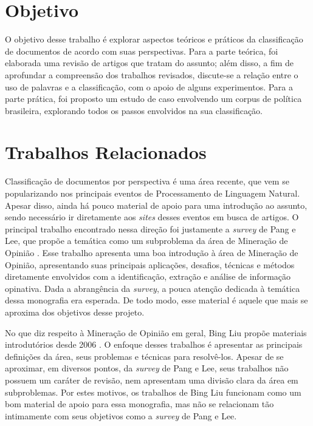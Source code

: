 
\section{Objetivo}
\label{objetivo}

O objetivo desse trabalho é explorar aspectos teóricos e práticos da classificação de documentos de acordo com suas perspectivas. Para a parte teórica, foi elaborada uma revisão de artigos que tratam do assunto; além disso, a fim de aprofundar a compreensão dos trabalhos revisados, discute-se a relação entre o uso de palavras e a classificação, com o apoio de alguns experimentos. Para a parte prática, foi proposto um estudo de caso envolvendo um corpus de política brasileira, explorando todos os passos envolvidos na sua classificação.

\section{Trabalhos Relacionados}
\label{relacionados}

Classificação de documentos por perspectiva é uma área recente, que vem se popularizando nos principais eventos de Processamento de Linguagem Natural. Apesar disso, ainda há pouco material de apoio para uma introdução ao assunto, sendo necessário ir diretamente aos \emph{sites} desses eventos em busca de artigos. O principal trabalho encontrado nessa direção foi justamente a \emph{survey} de Pang e Lee, que propõe a temática como um subproblema da área de Mineração de Opinião \cite{omsa}. Esse trabalho apresenta uma boa introdução à área de Mineração de Opinião, apresentando suas principais aplicações, desafios, técnicas e métodos diretamente envolvidos com a identificação, extração e análise de informação opinativa. Dada a abrangência da \emph{survey}, a pouca atenção dedicada à temática dessa monografia era esperada. De todo modo, esse material é aquele que mais se aproxima dos objetivos desse projeto.

No que diz respeito à Mineração de Opinião em geral, Bing Liu propõe materiais introdutórios desde 2006 \cite{bingliu} \cite{handbook-liu}. O enfoque desses trabalhos é apresentar as principais definições da área, seus problemas e técnicas para resolvê-los. Apesar de se aproximar, em diversos pontos, da \emph{survey} de Pang e Lee, seus trabalhos não possuem um caráter de revisão, nem apresentam uma divisão clara da área em subproblemas. Por estes motivos, os trabalhos de Bing Liu funcionam como um bom material de apoio para essa monografia, mas não se relacionam tão intimamente com seus objetivos como a \emph{survey} de Pang e Lee.

